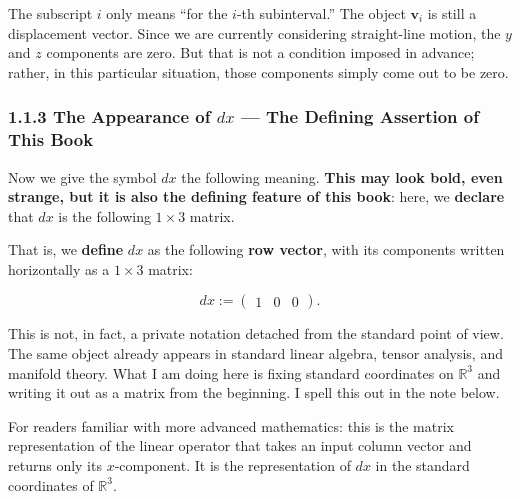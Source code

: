 The subscript \(i\) only means ``for the \(i\)-th subinterval.'' The
object \(\mathbf{v}_i\) is still a displacement vector. Since we are
currently considering straight-line motion, the \(y\) and \(z\)
components are zero. But that is not a condition imposed in advance;
rather, in this particular situation, those components simply come out
to be zero.

\clearpage

\hypertarget{the-appearance-of-dx-the-defining-assertion-of-this-book}{%
\subsubsection{\texorpdfstring{1.1.3 The Appearance of \(dx\) --- The
Defining Assertion of This
Book}{1.1.3 The Appearance of dx --- The Defining Assertion of This Book}}\label{the-appearance-of-dx-the-defining-assertion-of-this-book}}

Now we give the symbol \(dx\) the following meaning.
\textbf{This may look bold, even strange, but it is also the defining feature of this book}:
here, we \textbf{declare} that \(dx\) is the following \(1\times3\)
matrix.

That is, we \textbf{define} \(dx\) as the following \textbf{row vector},
with its components written horizontally as a \(1\times3\) matrix:

\[
dx := \begin{pmatrix} 1 & 0 & 0 \end{pmatrix}.
\]

This is not, in fact, a private notation detached from the standard
point of view. The same object already appears in standard linear
algebra, tensor analysis, and manifold theory. What I am doing here is
fixing standard coordinates on \(\mathbb{R}^3\) and writing it out as a
matrix from the beginning. I spell this out in the note below.

For readers familiar with more advanced mathematics: this is the matrix
representation of the linear operator that takes an input column vector
and returns only its \(x\)-component. It is the representation of \(dx\)
in the standard coordinates of \(\mathbb{R}^3\).

